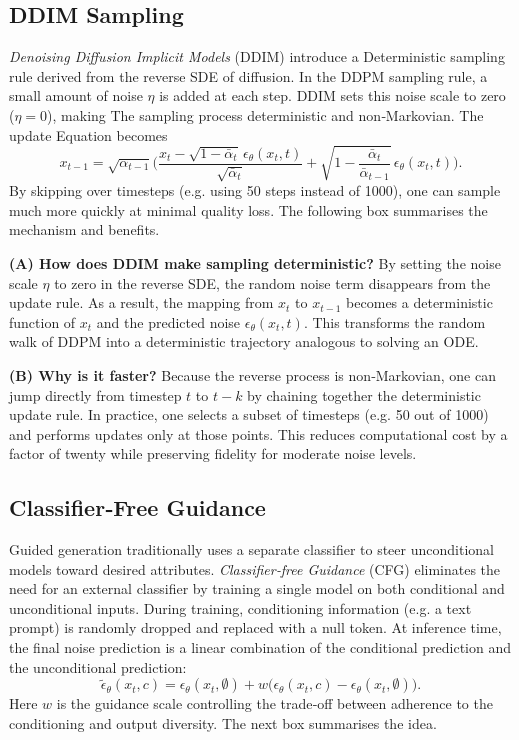 \subsection{DDIM Sampling}

\emph{Denoising Diffusion Implicit Models} (DDIM) introduce a
Deterministic sampling rule derived from the reverse SDE of diffusion.
In the DDPM sampling rule, a small amount of noise $\eta$ is added
at each step.  DDIM sets this noise scale to zero ($\eta=0$), making
The sampling process deterministic and non‑Markovian.  The update
Equation becomes
\begin{equation}
  x_{t-1} = \sqrt{\alpha_{t-1}}
  \Bigg(
    \frac{x_t - \sqrt{1-\bar{\alpha}_t}\,\epsilon_\theta(x_t,t)}{\sqrt{\bar{\alpha}_t}} +
    \sqrt{1-\frac{\bar{\alpha}_t}{\bar{\alpha}_{t-1}}}\,\epsilon_\theta(x_t,t)
  \Bigg).
\end{equation}
By skipping over timesteps (e.g. using 50 steps instead of 1000), one
can sample much more quickly at minimal quality loss.  The
following box summarises the mechanism and benefits.

\begin{solutionbox}
  \textbf{(A) How does DDIM make sampling deterministic?}  By
  setting the noise scale $\eta$ to zero in the reverse SDE, the
  random noise term disappears from the update rule.  As a result,
  the mapping from $x_t$ to $x_{t-1}$ becomes a deterministic
  function of $x_t$ and the predicted noise $\epsilon_\theta(x_t,t)$.
  This transforms the random walk of DDPM into a deterministic
  trajectory analogous to solving an ODE.

  \textbf{(B) Why is it faster?}  Because the reverse process is
  non‑Markovian, one can jump directly from timestep $t$ to $t-k$ by
  chaining together the deterministic update rule.  In practice, one
  selects a subset of timesteps (e.g. 50 out of 1000) and performs
  updates only at those points.  This reduces computational cost by a
  factor of twenty while preserving fidelity for moderate noise levels.
\end{solutionbox}

\subsection{Classifier‑Free Guidance}

Guided generation traditionally uses a separate classifier to steer
unconditional models toward desired attributes.  \emph{Classifier‑free
Guidance} (CFG) eliminates the need for an external classifier by
training a single model on both conditional and unconditional inputs.
During training, conditioning information (e.g. a text prompt) is
randomly dropped and replaced with a null token.  At inference time,
the final noise prediction is a linear combination of the
conditional prediction and the unconditional prediction:
\begin{equation}
  \tilde{\epsilon}_\theta(x_t,c) =
  \epsilon_\theta(x_t,\emptyset) + w \bigl(
    \epsilon_\theta(x_t,c) - \epsilon_\theta(x_t,\emptyset)
  \bigr).
\end{equation}
Here $w$ is the guidance scale controlling the trade‑off between
adherence to the conditioning and output diversity.  The next box
summarises the idea.

